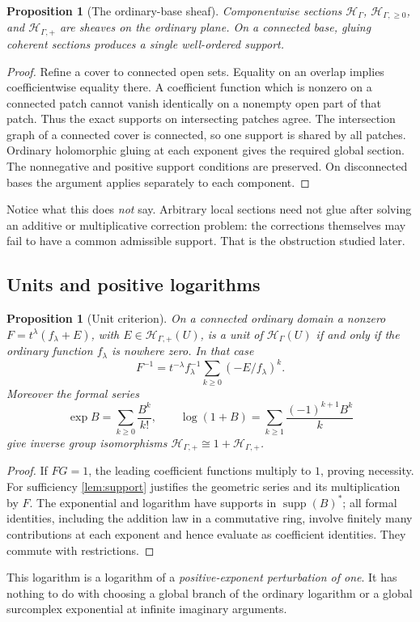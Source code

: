 \documentclass[11pt,letterpaper]{article}
\newtheorem{proposition}[theorem]{Proposition}
\theoremstyle{definition}
\theoremstyle{remark}
\newcommand{\HH}{\mathscr H_\Gamma}
\newcommand{\HP}{\mathscr H_{\Gamma,+}}
\newcommand{\HA}{\mathscr H_{\Gamma,\ge0}}
\newcommand{\supp}{\operatorname{supp}}
\numberwithin{equation}{section}
\begin{document}
\begin{proposition}[The ordinary-base sheaf]\label{prop:sheaf}
Componentwise sections $\HH$, $\HA$, and $\HP$ are sheaves on the ordinary plane. On a connected base, gluing coherent sections produces a single well-ordered support.
\end{proposition}
\begin{proof}
Refine a cover to connected open sets. Equality on an overlap implies coefficientwise equality there. A coefficient function which is nonzero on a connected patch cannot vanish identically on a nonempty open part of that patch. Thus the exact supports on intersecting patches agree. The intersection graph of a connected cover is connected, so one support is shared by all patches. Ordinary holomorphic gluing at each exponent gives the required global section. The nonnegative and positive support conditions are preserved. On disconnected bases the argument applies separately to each component.
\end{proof}
Notice what this does \emph{not} say. Arbitrary local sections need not glue after solving an additive or multiplicative correction problem: the corrections themselves may fail to have a common admissible support. That is the obstruction studied later.

\subsection{Units and positive logarithms}
\begin{proposition}[Unit criterion]\label{prop:units}
On a connected ordinary domain a nonzero $F=t^\lambda(f_\lambda+E)$, with $E\in\HP(U)$, is a unit of $\HH(U)$ if and only if the ordinary function $f_\lambda$ is nowhere zero. In that case
\begin{equation}\label{eq:unitinverse}
 F^{-1}=t^{-\lambda}f_\lambda^{-1}
 \sum_{k\ge0}(-E/f_\lambda)^k.
\end{equation}
Moreover the formal series
\[
 \exp B=\sum_{k\ge0}\frac{B^k}{k!},\qquad
 \log(1+B)=\sum_{k\ge1}\frac{(-1)^{k+1}B^k}{k}
\]
give inverse group isomorphisms $\HP\cong1+\HP$.
\end{proposition}
\begin{proof}
If $FG=1$, the leading coefficient functions multiply to $1$, proving necessity. For sufficiency \cref{lem:support} justifies the geometric series and its multiplication by $F$. The exponential and logarithm have supports in $\supp(B)^*$; all formal identities, including the addition law in a commutative ring, involve finitely many contributions at each exponent and hence evaluate as coefficient identities. They commute with restrictions.
\end{proof}
This logarithm is a logarithm of a \emph{positive-exponent perturbation of one}. It has nothing to do with choosing a global branch of the ordinary logarithm or a global surcomplex exponential at infinite imaginary arguments.
\end{document}
